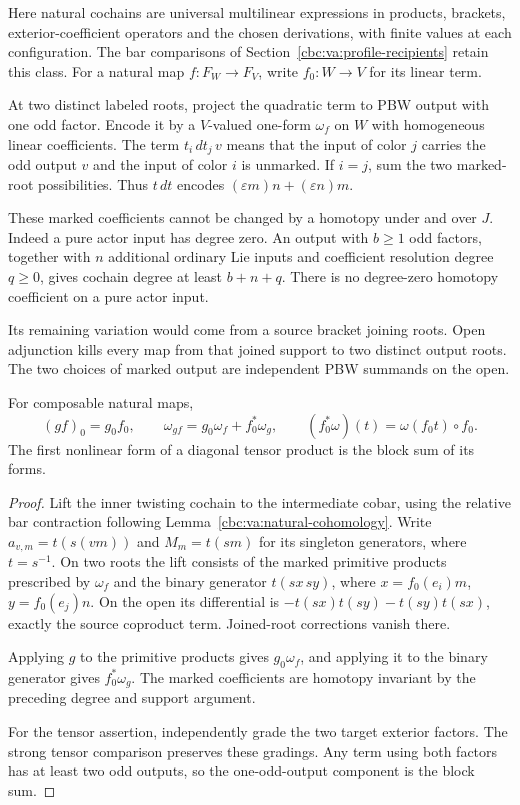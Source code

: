 Here natural cochains are universal multilinear expressions in
products, brackets, exterior-coefficient operators and the chosen
derivations, with finite values at each configuration. The bar
comparisons of Section~\ref{cbc:va:profile-recipients} retain this class.
For a natural map $f:F_W\to F_V$, write $f_0:W\to V$
for its linear term.

At two distinct labeled roots,
project the quadratic term to PBW output with one
odd factor. Encode it by a $V$-valued one-form
$\omega_f$ on $W$ with homogeneous linear coefficients.
The term $t_i\,dt_j\,v$ means that the input of color
$j$ carries the odd output $v$ and the input of color
$i$ is unmarked. If $i=j$, sum the two marked-root
possibilities. Thus $t\,dt$ encodes
$(\varepsilon m)n+(\varepsilon n)m$.

These marked coefficients cannot be changed by a homotopy
under and over $J$. Indeed a pure actor input has degree
zero. An output with $b\geq1$ odd factors, together with
$n$ additional ordinary Lie inputs and coefficient
resolution degree $q\geq0$, gives cochain degree at least
$b+n+q$. There is no degree-zero homotopy coefficient
on a pure actor input.

Its remaining variation would
come from a source bracket joining roots. Open
adjunction kills every map from that joined support
to two distinct output roots. The two choices of
marked output are independent PBW summands on the open.

\begin{lemma}\label{cbc:rc:marked-composition}
For composable natural maps,
\[
 (g f)_0=g_0f_0,
 \qquad \omega_{g f}=g_0\omega_f+f_0^*\omega_g,
 \qquad (f_0^*\omega)(t)=\omega(f_0t)\circ f_0.
\]
The first nonlinear form of a diagonal tensor product
is the block sum of its forms.
\end{lemma}
\begin{proof}
Lift the inner twisting cochain to the intermediate
cobar, using the relative bar contraction following
Lemma~\ref{cbc:va:natural-cohomology}.
Write $a_{v,m}=t(s(vm))$ and $M_m=t(sm)$ for its
singleton generators, where $t=s^{-1}$.
On two roots the lift consists of the marked primitive
products prescribed by $\omega_f$ and the binary
generator $t(sx\,sy)$, where
$x=f_0(e_i)m$, $y=f_0(e_j)n$.
On the open its differential is
$-t(sx)t(sy)-t(sy)t(sx)$, exactly the source
coproduct term. Joined-root corrections vanish there.

Applying $g$ to the primitive products gives
$g_0\omega_f$, and applying it to the binary generator
gives $f_0^*\omega_g$.
The marked coefficients are homotopy invariant by
the preceding degree and support argument.

For the tensor assertion, independently grade the
two target exterior factors. The strong tensor
comparison preserves these gradings. Any term
using both factors has at least two odd outputs,
so the one-odd-output component is the block sum.
\end{proof}

